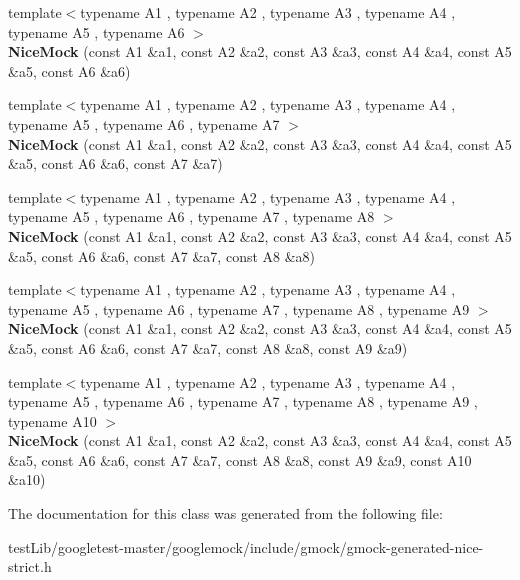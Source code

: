 \begin{DoxyCompactItemize}
\item 
\mbox{\label{classtesting_1_1NiceMock_a156d0fce85ac08abffdf4aa0c3975f81}} 
{\footnotesize template$<$typename A1 , typename A2 , typename A3 , typename A4 , typename A5 , typename A6 $>$ }\\{\bfseries Nice\+Mock} (const A1 \&a1, const A2 \&a2, const A3 \&a3, const A4 \&a4, const A5 \&a5, const A6 \&a6)
\item 
\mbox{\label{classtesting_1_1NiceMock_a946d75ece1fa3a066b7d9d6ab7828c55}} 
{\footnotesize template$<$typename A1 , typename A2 , typename A3 , typename A4 , typename A5 , typename A6 , typename A7 $>$ }\\{\bfseries Nice\+Mock} (const A1 \&a1, const A2 \&a2, const A3 \&a3, const A4 \&a4, const A5 \&a5, const A6 \&a6, const A7 \&a7)
\item 
\mbox{\label{classtesting_1_1NiceMock_ae8792aab6c024a50886856bf1093eedc}} 
{\footnotesize template$<$typename A1 , typename A2 , typename A3 , typename A4 , typename A5 , typename A6 , typename A7 , typename A8 $>$ }\\{\bfseries Nice\+Mock} (const A1 \&a1, const A2 \&a2, const A3 \&a3, const A4 \&a4, const A5 \&a5, const A6 \&a6, const A7 \&a7, const A8 \&a8)
\item 
\mbox{\label{classtesting_1_1NiceMock_a61cfc9282222928590bcdaf851a806c6}} 
{\footnotesize template$<$typename A1 , typename A2 , typename A3 , typename A4 , typename A5 , typename A6 , typename A7 , typename A8 , typename A9 $>$ }\\{\bfseries Nice\+Mock} (const A1 \&a1, const A2 \&a2, const A3 \&a3, const A4 \&a4, const A5 \&a5, const A6 \&a6, const A7 \&a7, const A8 \&a8, const A9 \&a9)
\item 
\mbox{\label{classtesting_1_1NiceMock_a4baf1da52f4c892fc02f6ba10c0b8c02}} 
{\footnotesize template$<$typename A1 , typename A2 , typename A3 , typename A4 , typename A5 , typename A6 , typename A7 , typename A8 , typename A9 , typename A10 $>$ }\\{\bfseries Nice\+Mock} (const A1 \&a1, const A2 \&a2, const A3 \&a3, const A4 \&a4, const A5 \&a5, const A6 \&a6, const A7 \&a7, const A8 \&a8, const A9 \&a9, const A10 \&a10)
\end{DoxyCompactItemize}


The documentation for this class was generated from the following file\+:\begin{DoxyCompactItemize}
\item 
test\+Lib/googletest-\/master/googlemock/include/gmock/gmock-\/generated-\/nice-\/strict.\+h\end{DoxyCompactItemize}
